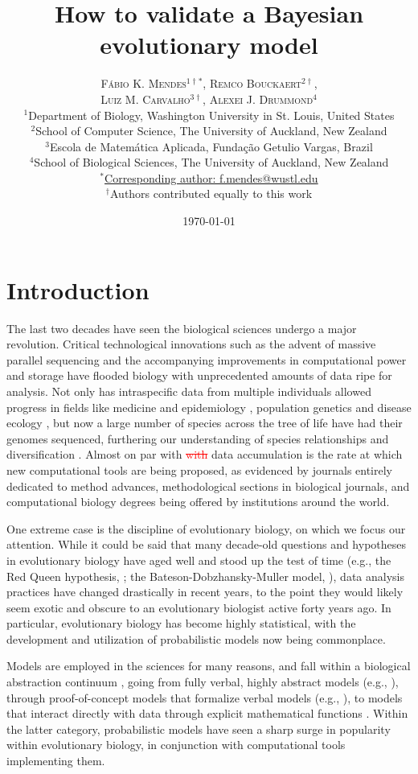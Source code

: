 \documentclass[oneside]{article}
\title{How to validate a Bayesian evolutionary model} %
\author{\textsc{F\'{a}bio K. Mendes$^{1\dagger*}$}, \textsc{Remco Bouckaert$^{2\dagger}$},\\
\textsc{Luiz M. Carvalho$^{3\dagger}$}, \textsc{Alexei J. Drummond$^{4}$} \\
\small $^1$Department of Biology, Washington University in St. Louis, United States\\
\small $^2$School of Computer Science, The University of Auckland, New Zealand\\
\small $^3$Escola de Matem\'{a}tica Aplicada, Fundaç\~{a}o Getulio Vargas, Brazil\\
\small $^4$School of Biological Sciences, The University of Auckland, New Zealand\\
\small
\href{mailto:f.mendes@auckland.ac.nz}{$^*$Corresponding author: f.mendes@wustl.edu}\\
{\small $^\dagger$Authors contributed equally to this work}
}
\date{\today} %
\begin{document}
\maketitle


\section*{Introduction}
The last two decades have seen the biological sciences undergo a major revolution.
Critical technological innovations such as the advent of massive parallel sequencing and the accompanying improvements in computational power and storage have flooded biology with unprecedented amounts of data ripe for analysis.
Not only has intraspecific data from multiple individuals allowed progress in fields like medicine and epidemiology \citep[e.g.,][]{1000g,humanmicrobiome,neafsey15}, population genetics \citep[e.g.,][]{lynch07,lack16,demanuel16} and disease ecology \citep[e.g.,][]{rosenblum13,bates18}, but now a large number of species across the tree of life have had their genomes sequenced, furthering our understanding of species relationships and diversification \citep[e.g.,][]{pease2016,kawahara19,upham19}.
Almost on par with \textcolor{red}{\st{with}} data accumulation is the rate at which new computational tools are being proposed, as evidenced by journals entirely dedicated to method advances, methodological sections in biological journals, and computational biology degrees being offered by institutions around the world.

One extreme case is the discipline of evolutionary biology, on which we focus our attention.
While it could be said that many decade-old questions and hypotheses in evolutionary biology have aged well and stood up the test of time (e.g., the Red Queen hypothesis, \citealt{vanvalen73,lively87,morran11,gibson15}; the Bateson-Dobzhansky-Muller model, \citealt{dob36,muller40,hopkins12,roda17}),
data analysis practices have changed drastically in recent years, to the point they would likely seem exotic and obscure to an evolutionary biologist active forty years ago. 
In particular, evolutionary biology has become highly statistical, with the development and utilization of probabilistic models now being commonplace.

Models are employed in the sciences for many reasons, and fall within a biological abstraction continuum \citep{servedio14}, going from fully verbal, highly abstract models (e.g., \citealt{vanvalen73}), through proof-of-concept models that formalize verbal models (e.g., \citealt{maynard78,reinhold99}), to models that interact directly with data through explicit mathematical functions \citep{yule24,f73,hky,hudson90}.
Within the latter category, probabilistic models have seen a sharp surge in popularity within evolutionary biology, in conjunction with computational tools implementing them.
\end{document}

